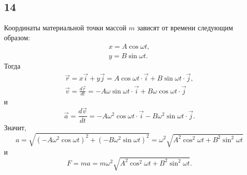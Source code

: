 \subsection{14}

Координаты материальной точки массой $m$ зависят от времени следующим образом:
\begin{gather*}
x=A\cos\omega t, \\
y=B\sin\omega t.
\end{gather*}
Тогда
\begin{gather*}
\vec r=x\vec i+y\vec j=A\cos\omega t\cdot\vec i+B\sin\omega t\cdot\vec j, \\
\vec v=\frac{d\vec r}{dt}=-A\omega\sin\omega t\cdot\vec i+B\omega\cos\omega t\cdot\vec j
\end{gather*}
и
\[
\vec a=\frac{d\vec v}{dt}=-A\omega^2\cos\omega t\cdot\vec i-B\omega^2\sin\omega t\cdot\vec j.
\]
Значит,
\[
a=\sqrt{\left(-A\omega^2\cos\omega t\right)^2+\left(-B\omega^2\sin\omega t\right)^2}=\omega^2\sqrt{A^2\cos^2\omega t+B^2\sin^2\omega t}
\]
и
\[
F=ma=m\omega^2\sqrt{A^2\cos^2\omega t+B^2\sin^2\omega t}.
\]